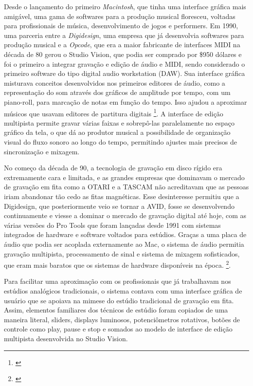 Desde o lançamento do primeiro \emph{Macintosh}, que tinha uma interface gráfica mais amigável, uma gama de softwares para a produção musical floresceu, voltadas para profissionais de música, desenvolvimento de jogos e performers. Em 1990, uma parceria entre a \emph{Digidesign}, uma empresa que já desenvolvia softwares para produção musical e a \emph{Opcode}, que era a maior fabricante de interfaces MIDI na década de 80 gerou o Studio Vision, que podia ser comprado por \$950 dólares e foi o primeiro a integrar gravação e edição de áudio e MIDI, sendo considerado o primeiro software do tipo digital audio workstation (DAW). Sua interface gráfica misturava conceitos desenvolvidos nos primeiros editores de áudio, como a representação do som através dos gráficos de amplitude por tempo, com um piano-roll, para marcação de notas em função do tempo. Isso ajudou a aproximar músicos que usavam editores de partitura digitais \footnote{\cite{ChrisHalaby2011}}. A interface de edição multipista permite gravar várias faixas e sobrepô-las paralelamente no espaço gráfico da tela, o que dá ao produtor musical a possibilidade de organização visual do fluxo sonoro ao longo do tempo, permitindo ajustes mais precisos de sincronização e mixagem.

No começo da década de 90, a tecnologia de gravação em disco rígido era extremamente cara e limitada, e as grandes empresas que dominavam o mercado de gravação em fita como a OTARI e a TASCAM não acreditavam que as pessoas iriam abandonar tão cedo as fitas magnéticas. Esse desinteresse permitiu que a Digidesign, que posteriormente veio se tornar a AVID, fosse se desenvolvendo continuamente e viesse a dominar o mercado de gravação digital até hoje, com as várias versões do Pro Tools que foram lançadas desde 1991 com sistemas integrados de hardware e software voltados para estúdios. Graças a uma placa de áudio que podia ser acoplada externamente ao Mac, o sistema de áudio permitia gravação multipista, processamento de sinal e sistema de mixagem sofisticados, que eram mais baratos que os sistemas de hardware disponíveis na época. \footnote{\cite{ChrisHalaby2011}}.

Para facilitar uma aproximação com os profissionais que já trabalhavam nos estúdios analógicos tradicionais, o sistema contava com uma interface gráfica de usuário que se apoiava na mimese do estúdio tradicional de gravação em fita. Assim, elementos familiares dos técnicos de estúdio foram copiados de uma maneira literal, sliders, displays luminosos, potenciômetros rotativos, botões de controle como play, pause e stop e somados ao modelo de interface de edição multipista desenvolvida no Studio Vision. 


